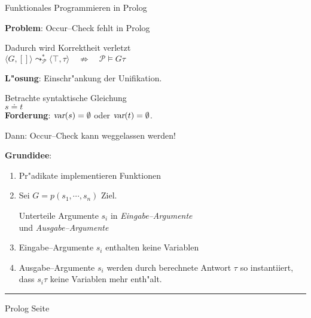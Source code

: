 \documentclass{slides}
\newcommand{\verum}{\top}
\newcounter{mypage}
\begin{document}
\begin{center}
Funktionales Programmieren in Prolog
\end{center}
\vspace*{0.5cm}

\footnotesize
\textbf{Problem}: Occur--Check fehlt in Prolog

Dadurch wird Korrektheit verletzt \\[0.3cm]
\hspace*{1.3cm} 
$\langle G, [] \rangle \leadsto_\mathcal{P}^* \langle \verum, \tau \rangle \quad \not\Rightarrow \quad \mathcal{P} \models G\tau$
\vspace*{0.3cm}

\textbf{L"osung}: Einschr"ankung der Unifikation.

Betrachte syntaktische Gleichung \\[0.3cm]
\hspace*{1.3cm} $s \doteq t$ \\[0.3cm]
\textbf{Forderung}:  $\textsl{var}(s) = \emptyset$ oder $\textsl{var}(t) = \emptyset$.

Dann: Occur--Check kann weggelassen werden!

\textbf{Grundidee}:
\begin{enumerate}
\item Pr"adikate implementieren Funktionen
\item Sei $G = p(s_1,\cdots,s_n)$ Ziel. 

      Unterteile Argumente $s_i$ in \emph{Eingabe--Argumente} \\
      und \emph{Ausgabe--Argumente}
\item Eingabe--Argumente $s_i$ enthalten keine Variablen
\item Ausgabe--Argumente $s_i$ werden durch berechnete Antwort $\tau$ so instantiiert,
      dass $s_i\tau$ keine Variablen mehr enth"alt.
\end{enumerate}

\vspace*{\fill}
\tiny \addtocounter{mypage}{1}
\rule{17cm}{1mm}
Prolog  \hspace*{\fill} Seite 



\end{document}
